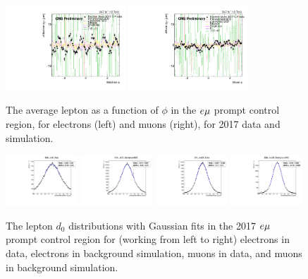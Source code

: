 \begin{figure}
\centering
\includegraphics[width=0.4\textwidth]{figures/corrections/d0_smearing/emu_2017/electronD0_50um_vs_electronPhi_pfx.pdf}
\includegraphics[width=0.4\textwidth]{figures/corrections/d0_smearing/emu_2017/muonD0_50um_vs_muonPhi_pfx.pdf}
\caption{The average lepton \ad as a function of $\phi$ in the $e{\mu}$ prompt control region, for electrons (left) and muons (right), for 2017 data and simulation.}
\label{uncorrected_avg_d0_vs_phi}
\end{figure}

\begin{figure}
\centering
\includegraphics[width=0.24\textwidth]{figures/corrections/d0_smearing/emu_2017/gaussian_fit_EMu_eD0_Data.pdf}
\includegraphics[width=0.24\textwidth]{figures/corrections/d0_smearing/emu_2017/gaussian_fit_EMu_eD0_BackgroundMC.pdf}
\includegraphics[width=0.24\textwidth]{figures/corrections/d0_smearing/emu_2017/gaussian_fit_EMu_muD0_Data.pdf} 
\includegraphics[width=0.24\textwidth]{figures/corrections/d0_smearing/emu_2017/gaussian_fit_EMu_muD0_BackgroundMC.pdf}
\caption{The lepton $d_0$ distributions with Gaussian fits in the 2017 $e{\mu}$ prompt control region for (working from left to right) electrons in data, electrons in background simulation, muons in data, and muons in background simulation.}
\label{gaussian_fits_2017}
\end{figure}


